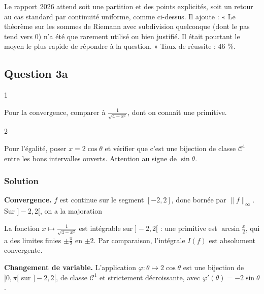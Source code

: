 \documentclass[11pt,a4paper]{article}
\newcommand{\equationajustee}[1]{%
  \sbox{\boiteequation}{$\displaystyle #1$}%
  \ifdim\wd\boiteequation>\linewidth
    \[\resizebox{\linewidth}{!}{\usebox{\boiteequation}}\]%
  \else
    \[#1\]%
  \fi}
\begin{document}
\begin{jury}

Le rapport 2026 attend soit une partition et des points explicités, soit un retour au cas standard par continuité uniforme, comme ci-dessus. Il ajoute : « Le théorème sur les sommes de Riemann avec subdivision quelconque (dont le pas tend vers 0) n'a été que rarement utilisé ou bien justifié. Il était pourtant le moyen le plus rapide de répondre à la question. » Taux de réussite : 46 \%.

\end{jury}

\hypertarget{question-3a}{%
\subsection{Question 3a}\label{question-3a}}

\begin{indication}{1}

Pour la convergence, comparer à \(\frac1{\sqrt{4-x^2}}\), dont on connaît une primitive.

\end{indication}

\begin{indication}{2}

Pour l'égalité, poser \(x=2\cos\theta\) et vérifier que c'est une bijection de classe \(\mathcal C^1\) entre les bons intervalles ouverts. Attention au signe de \(\sin\theta\).

\end{indication}

\hypertarget{solution-2}{%
\subsubsection{Solution}\label{solution-2}}

\textbf{Convergence.} \(f\) est continue sur le segment \([-2,2]\), donc bornée par \(\|f\|_\infty\). Sur \(]-2,2[\), on a la majoration

\equationajustee{\left|\frac{f(x)}{\sqrt{4-x^2}}\right|\le\frac{\|f\|_\infty}{\sqrt{4-x^2}}.}

La fonction \(x\mapsto\frac1{\sqrt{4-x^2}}\) est intégrable sur \(]-2,2[\) : une primitive est \(\arcsin\frac x2\), qui a des limites finies \(\pm\frac\pi2\) en \(\pm2\). Par comparaison, l'intégrale \(I(f)\) est absolument convergente.

\textbf{Changement de variable.} L'application \(\varphi:\theta\mapsto2\cos\theta\) est une bijection de \(]0,\pi[\) sur \(]-2,2[\), de classe \(\mathcal C^1\) et strictement décroissante, avec \(\varphi'(\theta)=-2\sin\theta\).
\end{document}
